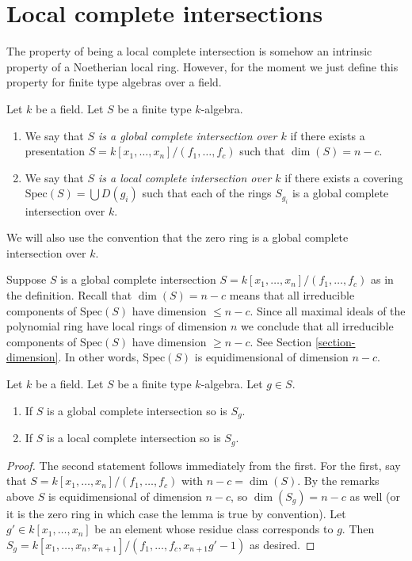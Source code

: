 \section{Local complete intersections}
\label{section-lci}

\noindent
The property of being a local complete intersection is
somehow an intrinsic property of a Noetherian local ring.
However, for the moment we just define this property for
finite type algebras over a field.

\begin{definition}
\label{definition-lci-field}
Let $k$ be a field.
Let $S$ be a finite type $k$-algebra.
\begin{enumerate}
\item We say that {\it $S$ is a global complete intersection over $k$}
if there exists a presentation $S = k[x_1, \ldots, x_n]/(f_1, \ldots, f_c)$
such that $\dim(S) = n - c$.
\item We say that {\it $S$ is a local complete intersection over $k$}
if there exists a covering $\text{Spec}(S) = \bigcup D(g_i)$ such
that each of the rings $S_{g_i}$ is a global complete intersection
over $k$.
\end{enumerate}
We will also use the convention that the zero ring is a global
complete intersection over $k$.
\end{definition}

\noindent
Suppose $S$ is a global complete intersection
$S = k[x_1, \ldots, x_n]/(f_1, \ldots, f_c)$
as in the definition.
Recall that $\dim(S) = n - c$ means that all irreducible
components of $\text{Spec}(S)$ have dimension $\leq n - c$.
Since all maximal ideals of the polynomial ring have local
rings of dimension $n$ we conclude that all irreducible
components of $\text{Spec}(S)$ have dimension $\geq n - c$.
See Section \ref{section-dimension}.
In other words, $\text{Spec}(S)$ is equidimensional
of dimension $n - c$.

\begin{lemma}
\label{lemma-localize-lci}
Let $k$ be a field.
Let $S$ be a finite type $k$-algebra.
Let $g \in S$.
\begin{enumerate}
\item If $S$ is a global complete intersection so is $S_g$.
\item If $S$ is a local complete intersection so is $S_g$.
\end{enumerate}
\end{lemma}

\begin{proof}
The second statement follows immediately from the first.
For the first, say that $S = k[x_1, \ldots, x_n]/(f_1, \ldots, f_c)$
with $n - c = \dim(S)$. By the remarks above $S$ is equidimensional
of dimension $n - c$, so $\dim(S_g) = n - c$ as well (or it is
the zero ring in which case the lemma is true by convention).
Let $g' \in k[x_1, \ldots, x_n]$
be an element whose residue class corresponds to $g$.
Then
$S_g =  k[x_1, \ldots, x_n, x_{n + 1}]/(f_1, \ldots, f_c, x_{n + 1}g' - 1)$
as desired.
\end{proof}

